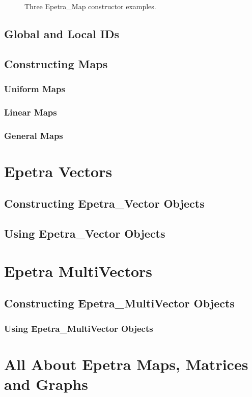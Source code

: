 \documentclass[12pt,relax]{EpetraUserGuide}
\newcommand{\map}{Epetra\_Map}
\renewcommand{\vector}{Epetra\_Vector}
\newcommand{\multivector}{Epetra\_MultiVector}
\begin{document}
\begin{figure}
\begin{center}

\end{center}
\caption{\label{Figure:MapExamples} Three \map{} constructor examples.}
\end{figure}

\subsection{Global and Local IDs}
\subsection{Constructing Maps}
\subsubsection{Uniform Maps}
\subsubsection{Linear Maps}
\subsubsection{General Maps}

\section{Epetra Vectors}
\subsection{Constructing \vector{} Objects}
\subsection{Using \vector{} Objects}
\section{Epetra MultiVectors}
\subsection{Constructing \multivector{} Objects}
\subsubsection{Using \multivector{} Objects}
\section{All About Epetra Maps, Matrices and Graphs}
\label{Section:MapsAndMatrices}
\end{document}
